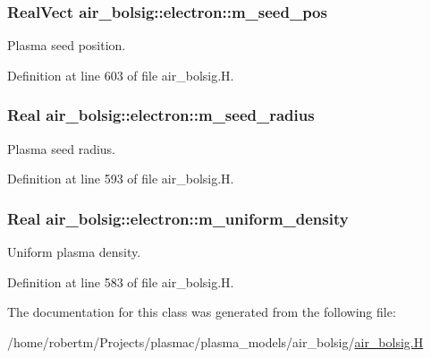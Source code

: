 \subsubsection[{\texorpdfstring{m\+\_\+seed\+\_\+pos}{m_seed_pos}}]{\setlength{\rightskip}{0pt plus 5cm}Real\+Vect air\+\_\+bolsig\+::electron\+::m\+\_\+seed\+\_\+pos}\hypertarget{classair__bolsig_1_1electron_a6fc1ec1a6c64fcc89922f03bcb298ee2}{}\label{classair__bolsig_1_1electron_a6fc1ec1a6c64fcc89922f03bcb298ee2}


Plasma seed position. 



Definition at line 603 of file air\+\_\+bolsig.\+H.

\subsubsection[{\texorpdfstring{m\+\_\+seed\+\_\+radius}{m_seed_radius}}]{\setlength{\rightskip}{0pt plus 5cm}Real air\+\_\+bolsig\+::electron\+::m\+\_\+seed\+\_\+radius}\hypertarget{classair__bolsig_1_1electron_a470e47d3516c19ffdeb132ff749b4aa8}{}\label{classair__bolsig_1_1electron_a470e47d3516c19ffdeb132ff749b4aa8}


Plasma seed radius. 



Definition at line 593 of file air\+\_\+bolsig.\+H.

\subsubsection[{\texorpdfstring{m\+\_\+uniform\+\_\+density}{m_uniform_density}}]{\setlength{\rightskip}{0pt plus 5cm}Real air\+\_\+bolsig\+::electron\+::m\+\_\+uniform\+\_\+density}\hypertarget{classair__bolsig_1_1electron_abc1d0d05de7a65ddefea9b375bc48c87}{}\label{classair__bolsig_1_1electron_abc1d0d05de7a65ddefea9b375bc48c87}


Uniform plasma density. 



Definition at line 583 of file air\+\_\+bolsig.\+H.



The documentation for this class was generated from the following file\+:\begin{DoxyCompactItemize}
\item 
/home/robertm/\+Projects/plasmac/plasma\+\_\+models/air\+\_\+bolsig/\hyperlink{air__bolsig_8H}{air\+\_\+bolsig.\+H}\end{DoxyCompactItemize}
